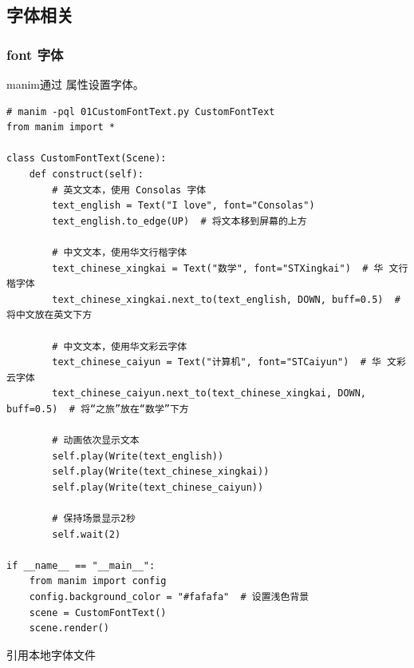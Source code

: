\subsection{字体相关}
\label{subsec:manim_text_formula_style_font}
\subsubsection{font 字体}
\label{subsubsec:manim_text_formula_style_font_font}
manim通过  属性设置字体。

\begin{lstlisting}[style=pythonstyle]
# manim -pql 01CustomFontText.py CustomFontText    
from manim import *

class CustomFontText(Scene):
    def construct(self):
        # 英文文本，使用 Consolas 字体
        text_english = Text("I love", font="Consolas")
        text_english.to_edge(UP)  # 将文本移到屏幕的上方

        # 中文文本，使用华文行楷字体
        text_chinese_xingkai = Text("数学", font="STXingkai")  # 华 文行楷字体
        text_chinese_xingkai.next_to(text_english, DOWN, buff=0.5)  # 将中文放在英文下方

        # 中文文本，使用华文彩云字体
        text_chinese_caiyun = Text("计算机", font="STCaiyun")  # 华 文彩云字体
        text_chinese_caiyun.next_to(text_chinese_xingkai, DOWN, buff=0.5)  # 将“之旅”放在“数学”下方

        # 动画依次显示文本
        self.play(Write(text_english))
        self.play(Write(text_chinese_xingkai))
        self.play(Write(text_chinese_caiyun))

        # 保持场景显示2秒
        self.wait(2)

if __name__ == "__main__":
    from manim import config
    config.background_color = "#fafafa"  # 设置浅色背景
    scene = CustomFontText()
    scene.render()
\end{lstlisting}    

引用本地字体文件

